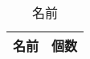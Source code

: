 \begin{table}[htbp]
  \caption{名前}
  \centering
    \begin{tabular}{|c|c|}\hline
      \multicolumn{1}{|c|}{名前} & \multicolumn{1}{c|}{個数} \\ \hline
    \end{tabular}
  \label{tab:ラベル}
\end{table}
